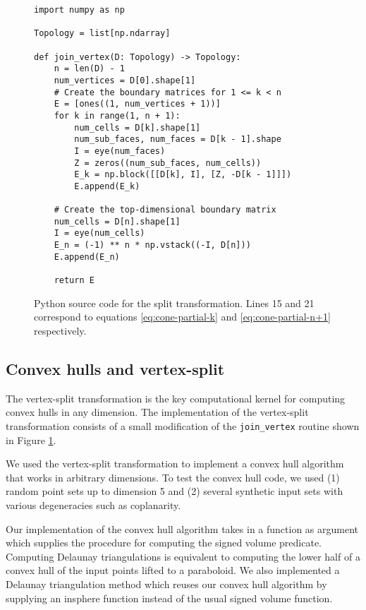\documentclass[twocolumn]{article}
\begin{document}
\begin{figure}
    \begin{verbatim}
import numpy as np

Topology = list[np.ndarray]

def join_vertex(D: Topology) -> Topology:
    n = len(D) - 1
    num_vertices = D[0].shape[1]
    # Create the boundary matrices for 1 <= k < n
    E = [ones((1, num_vertices + 1))]
    for k in range(1, n + 1):
        num_cells = D[k].shape[1]
        num_sub_faces, num_faces = D[k - 1].shape
        I = eye(num_faces)
        Z = zeros((num_sub_faces, num_cells))
        E_k = np.block([[D[k], I], [Z, -D[k - 1]]])
        E.append(E_k)

    # Create the top-dimensional boundary matrix
    num_cells = D[n].shape[1]
    I = eye(num_cells)
    E_n = (-1) ** n * np.vstack((-I, D[n]))
    E.append(E_n)

    return E
    \end{verbatim}
    \caption{Python source code for the split transformation.
    Lines 15 and 21 correspond to equations \eqref{eq:cone-partial-k} and \eqref{eq:cone-partial-n+1} respectively.}
    \label{fig:join-vertex-source-code}
\end{figure}

\subsection{Convex hulls and vertex-split}

The vertex-split transformation is the key computational kernel for computing convex hulls in any dimension.
The implementation of the vertex-split transformation consists of a small modification of the \texttt{join\_vertex} routine shown in Figure \ref{fig:join-vertex-source-code}.

We used the vertex-split transformation to implement a convex hull algorithm that works in arbitrary dimensions.
To test the convex hull code, we used (1) random point sets up to dimension 5 and (2) several synthetic input sets with various degeneracies such as coplanarity.

Our implementation of the convex hull algorithm takes in a function as argument which supplies the procedure for computing the signed volume predicate.
Computing Delaunay triangulations is equivalent to computing the lower half of a convex hull of the input points lifted to a paraboloid.
We also implemented a Delaunay triangulation method which reuses our convex hull algorithm by supplying an insphere function instead of the usual signed volume function.
\end{document}
